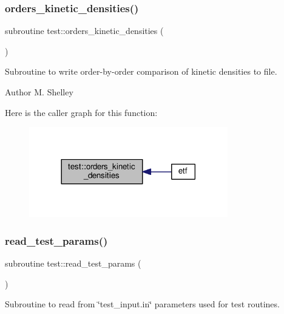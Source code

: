 \subsubsection{\texorpdfstring{orders\+\_\+kinetic\+\_\+densities()}{orders\_kinetic\_densities()}}
{\footnotesize\ttfamily subroutine test\+::orders\+\_\+kinetic\+\_\+densities (\begin{DoxyParamCaption}{ }\end{DoxyParamCaption})}



Subroutine to write order-\/by-\/order comparison of kinetic densities to file. 

\begin{DoxyAuthor}{Author}
M. Shelley 
\end{DoxyAuthor}
Here is the caller graph for this function\+:
\nopagebreak
\begin{figure}[H]
\begin{center}
\leavevmode
\includegraphics[width=245pt]{namespacetest_a12069a39539c68f8d22f7eb4219d2e2b_icgraph}
\end{center}
\end{figure}
\mbox{\label{namespacetest_a2d72f655d80bac0b01030b9cbda3518f}} 
\subsubsection{\texorpdfstring{read\+\_\+test\+\_\+params()}{read\_test\_params()}}
{\footnotesize\ttfamily subroutine test\+::read\+\_\+test\+\_\+params (\begin{DoxyParamCaption}{ }\end{DoxyParamCaption})}



Subroutine to read from \char`\"{}test\+\_\+input.\+in\char`\"{} parameters used for test routines. 

